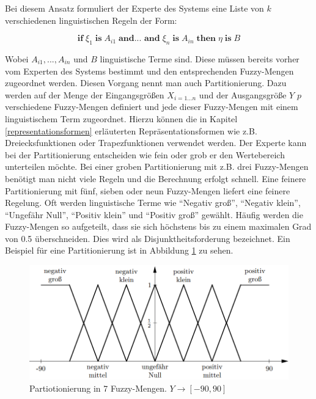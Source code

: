 \documentclass[12pt,a4paper,bibliography=totocnumbered,listof=totocnumbered, abstracton]{scrartcl}
\theoremstyle{Umgebung}
\begin{document}
Bei diesem Ansatz formuliert der Experte des Systems eine Liste von $k$ verschiedenen linguistischen Regeln  der Form:

\begin{equation}
	\textbf{if} \; \xi_1 \; \textbf{is} \; A_{i1} \; \textbf{and... and} \; \xi_n \; \textbf{is} \; A_{in} \; \textbf{then} \; \eta \;\textbf{is} \;B
\end{equation}

Wobei $A_{i1},...,A_{in}$ und $B$ linguistische Terme sind. Diese müssen bereits vorher vom Experten des Systems bestimmt und den entsprechenden Fuzzy-Mengen zugeordnet werden. Diesen Vorgang nennt man auch Partitionierung. Dazu werden auf der Menge der Eingangsgrößen $X_{i=1...n}$ und der Ausgangsgröße $Y$ $p$ verschiedene Fuzzy-Mengen definiert und jede dieser Fuzzy-Mengen mit einem linguistischem Term zugeordnet. Hierzu können die in Kapitel \ref{representationsformen} erläuterten Repräsentationsformen wie z.B. Dreiecksfunktionen oder Trapezfunktionen verwendet werden. Der Experte kann bei der Partitionierung entscheiden wie fein oder grob er den Wertebereich unterteilen möchte. Bei einer groben Partitionierung mit z.B. drei Fuzzy-Mengen benötigt man nicht viele Regeln und die Berechnung erfolgt schnell. Eine feinere Partitionierung mit fünf, sieben oder neun Fuzzy-Mengen liefert eine feinere Regelung. Oft werden linguistische Terme wie \enquote{Negativ groß}, \enquote{Negativ klein}, \enquote{Ungefähr Null}, \enquote{Positiv klein} und \enquote{Positiv groß} gewählt. Häufig werden die Fuzzy-Mengen so aufgeteilt, dass sie sich höchstens bis zu einem maximalen Grad von 0.5 überschneiden. Dies wird als Disjunktheitsforderung bezeichnet. Ein Beispiel für eine Partitionierung ist in Abbildung \ref{fig:partitionierung} zu sehen.

\begin{figure}
	\centering
	\includegraphics[width=0.7\linewidth]{img/partitionierung}
	\caption{Partiotionierung in 7 Fuzzy-Mengen. $ Y \rightarrow \left[-90,90\right]$}
	\label{fig:partitionierung}
\end{figure}
\end{document}
